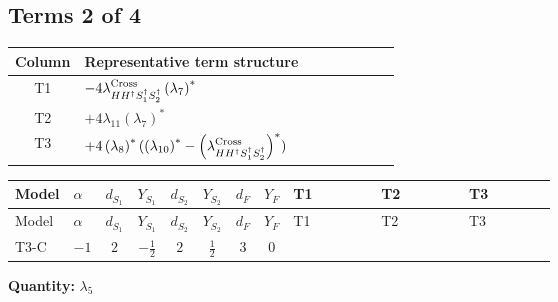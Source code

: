 \documentclass[8pt]{article}
\begin{document}
\begin{landscape}
\subsection*{Terms 2 of 4}
\begin{center}
\begin{tabular}{@{}c >{\raggedright\arraybackslash}p{0.82\linewidth}@{}}
\toprule
Column & Representative term structure \\
\midrule
T1 & \(\displaystyle -4 {\lambda_{H H^\dagger S_1^\dagger S_2^\dagger}^{\rm Cross}} \left({\lambda_{7}}\right)^{*}\) \\
\midrule
T2 & \(\displaystyle +4 {\lambda_{11}} \left({\lambda_{7}}\right)^{*}\) \\
\midrule
T3 & \(\displaystyle +4 \left({\lambda_{8}}\right)^{*} (\left({\lambda_{10}}\right)^{*}-\left({\lambda_{H H^\dagger S_1^\dagger S_2^\dagger}^{\rm Cross}}\right)^{*})\) \\
\midrule
\bottomrule
\end{tabular}
\end{center}
\smallskip
\tiny
\begin{longtable}{@{}llcccccc >{\raggedright\arraybackslash}p{0.21\linewidth} >{\raggedright\arraybackslash}p{0.21\linewidth} >{\raggedright\arraybackslash}p{0.21\linewidth}@{}}
\toprule
Model & $\alpha$ & $d_{S_1}$ & $Y_{S_1}$ & $d_{S_2}$ & $Y_{S_2}$ & $d_F$ & $Y_F$ & T1 & T2 & T3 \\
\midrule
\endfirsthead
\toprule
Model & $\alpha$ & $d_{S_1}$ & $Y_{S_1}$ & $d_{S_2}$ & $Y_{S_2}$ & $d_F$ & $Y_F$ & T1 & T2 & T3 \\
\midrule
\endhead
T3-C & $-1$ & $2$ & $-\frac{1}{2}$ & $2$ & $\frac{1}{2}$ & $3$ & $0$ & \scriptsize\adjustbox{max width=\linewidth}{$\begin{gathered} -4 {\lambda_{H H^\dagger S_1^\dagger S_2^\dagger}^{\rm Cross}} \left({\lambda_{7}}\right)^{*}\end{gathered}$} & \scriptsize\adjustbox{max width=\linewidth}{$\begin{gathered} +4 {\lambda_{11}} \left({\lambda_{7}}\right)^{*}\end{gathered}$} & \scriptsize\adjustbox{max width=\linewidth}{$\begin{gathered} +4 \left({\lambda_{8}}\right)^{*} (\left({\lambda_{10}}\right)^{*}-\left({\lambda_{H H^\dagger S_1^\dagger S_2^\dagger}^{\rm Cross}}\right)^{*})\end{gathered}$} \\
\midrule
\bottomrule
\end{longtable}
\clearpage
\noindent\textbf{Quantity: }$\lambda_5$\par\smallskip

\end{landscape}
\end{document}
